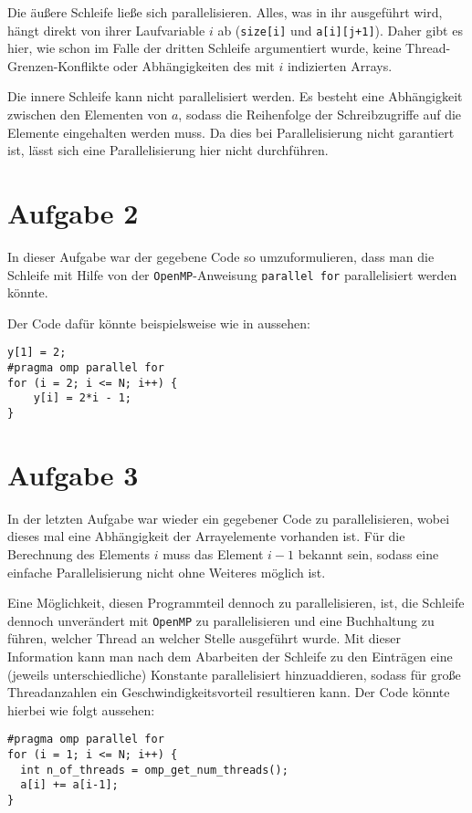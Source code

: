 Die äußere Schleife ließe sich parallelisieren. Alles, was in ihr ausgeführt wird,
hängt direkt von ihrer Laufvariable $i$ ab (\texttt{size[i]} und \texttt{a[i][j+1]}).
Daher gibt es hier, wie schon im Falle der dritten Schleife argumentiert wurde, keine
Thread-Grenzen-Konflikte oder Abhängigkeiten des mit $i$ indizierten Arrays.

Die innere Schleife kann nicht parallelisiert werden. Es besteht eine Abhängigkeit
zwischen den Elementen von $a$, sodass die Reihenfolge der Schreibzugriffe auf
die Elemente eingehalten werden muss. Da dies bei Parallelisierung nicht
garantiert ist, lässt sich eine Parallelisierung hier nicht durchführen.

\section*{Aufgabe 2}

In dieser Aufgabe war der gegebene Code so umzuformulieren, dass man die Schleife
mit Hilfe von der \texttt{OpenMP}-Anweisung \texttt{parallel for} parallelisiert
werden könnte.

Der Code dafür könnte beispielsweise wie in  aussehen:

\begin{lstlisting}[caption=Parallelisierte Schleife,label=lst:code2]
y[1] = 2;
#pragma omp parallel for
for (i = 2; i <= N; i++) {
    y[i] = 2*i - 1;
}
\end{lstlisting}

\section*{Aufgabe 3}

In der letzten Aufgabe war wieder ein gegebener Code zu parallelisieren, wobei dieses 
mal eine Abhängigkeit der Arrayelemente vorhanden ist. Für die Berechnung des Elements
$i$ muss das Element $i-1$ bekannt sein, sodass eine einfache Parallelisierung nicht
ohne Weiteres möglich ist.

% 

Eine Möglichkeit, diesen Programmteil dennoch zu parallelisieren, ist, die Schleife
dennoch unverändert mit \texttt{OpenMP} zu parallelisieren und eine Buchhaltung
zu führen, welcher Thread an welcher Stelle ausgeführt wurde. Mit dieser Information
kann man nach dem Abarbeiten der Schleife zu den Einträgen eine (jeweils unterschiedliche)
Konstante parallelisiert hinzuaddieren, sodass für große Threadanzahlen ein Geschwindigkeitsvorteil
resultieren kann. Der Code könnte hierbei wie folgt aussehen:

\begin{lstlisting}[caption=Parallelisierte Schleife,label=lst:code3_1]
#pragma omp parallel for
for (i = 1; i <= N; i++) {
  int n_of_threads = omp_get_num_threads();
  a[i] += a[i-1];
}
\end{lstlisting}